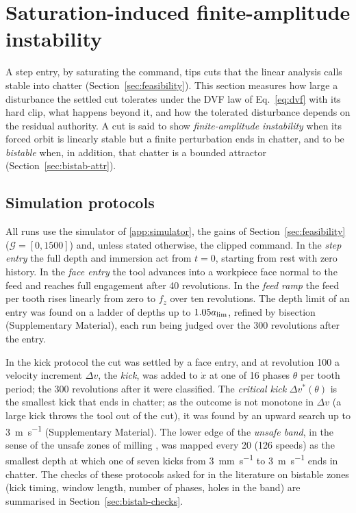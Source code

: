 \section{Saturation-induced finite-amplitude instability}\label{sec:bistability}

A step entry, by saturating the command, tips cuts that the linear analysis calls stable into chatter (Section~\ref{sec:feasibility}). This section measures how large a disturbance the settled cut tolerates under the DVF law of Eq.~\eqref{eq:dvf} with its hard clip, what happens beyond it, and how the tolerated disturbance depends on the residual authority. A cut is said to show \emph{finite-amplitude instability} when its forced orbit is linearly stable but a finite perturbation ends in chatter, and to be \emph{bistable} when, in addition, that chatter is a bounded attractor (Section~\ref{sec:bistab-attr}).

\subsection{Simulation protocols}\label{sec:bistab-prot}

All runs use the simulator of \ref{app:simulator}, the gains of Section~\ref{sec:feasibility} ($\mathcal G=[0,1500]$) and, unless stated otherwise, the clipped command. In the \emph{step entry} the full depth and immersion act from $t=0$, starting from rest with zero history. In the \emph{face entry} the tool advances into a workpiece face normal to the feed and reaches full engagement after 40 revolutions. In the \emph{feed ramp} the feed per tooth rises linearly from zero to $f_z$ over ten revolutions. The depth limit of an entry was found on a ladder of depths up to $1.05a_{\lim}$, refined by bisection (Supplementary Material), each run being judged over the 300 revolutions after the entry.

In the kick protocol the cut was settled by a face entry, and at revolution 100 a velocity increment $\Delta v$, the \emph{kick}, was added to $\dot x$ at one of 16 phases $\theta$ per tooth period; the 300 revolutions after it were classified. The \emph{critical kick} $\Delta v^*(\theta)$ is the smallest kick that ends in chatter; as the outcome is not monotone in $\Delta v$ (a large kick throws the tool out of the cut), it was found by an upward search up to \SI{3}{\metre\per\second} (Supplementary Material). The lower edge of the \emph{unsafe band}, in the sense of the unsafe zones of milling \citep{dombovari2015bistable,dombovari2019experimental}, was mapped every \SI{20}{\rpm} (126 speeds) as the smallest depth at which one of seven kicks from \SI{3}{\milli\metre\per\second} to \SI{3}{\metre\per\second} ends in chatter. The checks of these protocols asked for in the literature on bistable zones (kick timing, window length, number of phases, holes in the band) are summarised in Section~\ref{sec:bistab-checks}.

